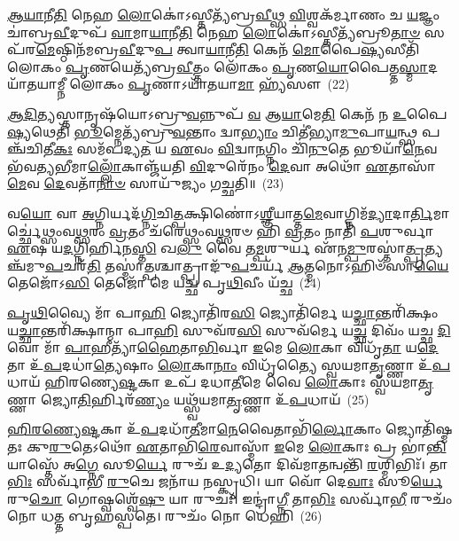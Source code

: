 \-\ul{𑌆}\-\-\ul{𑌯𑌾}\-𑌨𑍀\-\ul{𑌤𑌿} 𑌨𑍇𑌹 \ul{𑌲𑍋}\-𑌕𑍋॑\-𑌽𑌸𑍍𑌤𑍀𑌤𑍍𑌯᳴𑌬𑍍𑌰\-\ul{𑌵𑍀}\-𑌥𑍍𑌸 \ul{𑌵𑌿}\-𑌶𑍍𑌵𑌕᳴𑌰𑍍𑌮𑌾𑌣𑌂 𑌚 \ul{𑌯}\-𑌜𑍍𑌞𑌂 𑌚𑌾॑𑌬𑍍𑌰\-\ul{𑌵𑍀}\-𑌦𑍁𑌪᳴ \ul{𑌵𑌾}\-𑌮𑌾\-\ul{𑌯𑌾}\-𑌨𑍀\-\ul{𑌤𑌿} 𑌨𑍇𑌹 \ul{𑌲𑍋}\-𑌕𑍋॑\-𑌽𑌸𑍍𑌤𑍀𑌤𑍍𑌯᳴𑌬𑍍𑌰𑍂\-\ul{𑌤𑌾}\-\-\ul{𑍞} 𑌸 𑌪᳴𑌰\-\ul{𑌮𑍇}\-𑌷𑍍𑌠𑌿𑌨᳴𑌮𑌬𑍍𑌰\-\ul{𑌵𑍀}\-𑌦𑍁\-\ul{𑌪} 𑌤𑍍𑌵𑌾\-\ul{𑌯𑌾}\-𑌨𑍀\-\ul{𑌤𑌿} 𑌕𑍇𑌨᳴ \ul{𑌮𑍋}\-𑌪𑍈\-\ul{𑌷𑍍𑌯}\-𑌸𑍀𑌤𑌿᳴ 𑌲𑍋𑌕𑌂 \ul{𑌪𑍃}\-𑌣𑌯𑍇𑌤𑍍𑌯᳴𑌬𑍍𑌰\-\ul{𑌵𑍀}\-𑌤𑍍𑌤𑌂 𑌲𑍋᳴𑌕𑌂 \ul{𑌪𑍃}\-𑌣\-\ul{𑌯𑍋}\-𑌪𑍈𑌤𑍍𑌤\-\ul{𑌸𑍍𑌮𑌾}\-𑌦𑌯𑌾᳴𑌤𑌯𑌾𑌮𑍍𑌨𑍀 𑌲𑍋𑌕𑌂 \ul{𑌪𑍃}\-𑌣𑌾\-𑌽𑌯𑌾᳴𑌤𑌯𑌾\-\ul{𑌮𑌾} 𑌹𑍍𑌯᳴𑌸𑍗~(22)

\-\ul{𑌆}\-\-\ul{𑌦𑌿}\-𑌤𑍍𑌯𑌸𑍍𑌤𑌾𑌨𑍃𑌷᳴𑌯𑍋\-𑌽𑌬𑍍𑌰𑍁\-\ul{𑌵}\-𑌨𑍍𑌨𑍁𑌪᳴ \ul{𑌵} 𑌆\-\ul{𑌯𑌾}\-𑌮𑍇\-\ul{𑌤𑌿} 𑌕𑍇𑌨᳴ 𑌨 \ul{𑌉}\-𑌪𑍈\-\ul{𑌷𑍍𑌯}\-𑌥𑍇𑌤𑌿᳴ \ul{𑌭𑍂}\-𑌮𑍍𑌨𑍇𑌤𑍍𑌯᳴𑌬𑍍𑌰𑍁\-\ul{𑌵}\-𑌨𑍍𑌤𑌾𑌂 𑌦𑍍𑌵𑌾\-\ul{𑌭𑍍𑌯𑌾𑌂} 𑌚𑌿𑌤𑍀॑𑌭𑍍𑌯𑌾\-\ul{𑌮𑍁}\-𑌪𑌾\-\ul{𑌯}\-𑌨𑍍𑌥𑍍𑌸 𑌪𑌞𑍍𑌚᳴𑌚𑌿𑌤𑍀\-\ul{𑌕𑌃} 𑌸𑌮᳴𑌪𑌦𑍍𑌯\-\ul{𑌤} 𑌯 \ul{𑌏}\-𑌵𑌂 \ul{𑌵𑌿}\-𑌦𑍍𑌵𑌾\-\ul{𑌨}\-𑌗𑍍𑌨𑌿𑌂 𑌚𑌿᳴\-\ul{𑌨𑍁}\-𑌤𑍇 𑌭𑍂𑌯𑌾᳴\-\ul{𑌨𑍇}\-𑌵 𑌭᳴𑌵\-\ul{𑌤𑍍𑌯}\-𑌭𑍀𑌮𑌾\-\ul{𑌲𑍍𑌲𑍋𑌁}\-𑌕𑌾𑌞𑍍𑌜᳴𑌯𑌤𑌿 \ul{𑌵𑌿}\-𑌦𑍁𑌰𑍇᳴𑌨𑌂 \ul{𑌦𑍇}\-𑌵𑌾 𑌅𑌥𑍋᳴ \ul{𑌏}\-𑌤𑌾𑌸𑌾᳴\-\ul{𑌮𑍇}\-𑌵 \ul{𑌦𑍇}\-𑌵𑌤𑌾᳴\-\ul{𑌨𑌾}\-\-\ul{𑍞} 𑌸𑌾𑌯𑍁᳴𑌜𑍍𑌯𑌂 𑌗𑌚𑍍𑌛𑌤𑌿॥~(23)

{\anuvakamend[{𑌤𑌮᳴𑌸𑌾\-𑌽\-𑌽\-\ul{𑌦𑌿}\-𑌤𑍍𑌯𑍋॑\-𑌽𑌸𑍍𑌤𑍀\-\ul{𑌤𑌿} 𑌦𑌿𑌶᳴ 𑌆\-\ul{𑌦𑌿}\-𑌤𑍍𑌯𑌃 \ul{𑌪𑍍𑌰}\-𑌜𑌾𑌪᳴𑌤𑌿𑌮𑌬𑍍𑌰\-\ul{𑌵𑍀}\-𑌦𑍁𑌪᳴ \ul{𑌤𑍍𑌵𑌾}\-\-𑌽𑌸𑍗 𑌪𑌞𑍍𑌚᳴𑌚𑌤𑍍𑌵𑌾𑌰𑌿𑍞𑌶𑌚𑍍𑌚}]}%

𑌵\-\ul{𑌯𑍋} 𑌵𑌾 \ul{𑌅}\-𑌗𑍍𑌨𑌿𑌰𑍍𑌯𑌦᳴\-\ul{𑌗𑍍𑌨𑌿}\-𑌚𑌿\-\ul{𑌤𑍍𑌪}\-𑌕𑍍𑌷𑌿𑌣𑍋॑\-𑌽\-\ul{𑌶𑍍𑌞𑍀}\-𑌯𑌾𑌤𑍍𑌤\-\ul{𑌮𑍇}\-𑌵𑌾𑌗𑍍𑌨𑌿𑌮᳴\-\ul{𑌦𑍍𑌯𑌾}\-𑌦𑌾\-\ul{𑌰𑍍𑌤𑌿}\-𑌮𑌾𑌰𑍍𑌚𑍍𑌛𑍇॑𑌥𑍍𑌸𑌂𑌵\-\ul{𑌥𑍍𑌸}\-𑌰𑌂 \ul{𑌵𑍍𑌰}\-𑌤𑌂 𑌚᳴𑌰𑍇𑌥𑍍𑌸𑌂𑌵\-\ul{𑌥𑍍𑌸}\-𑌰𑍞 𑌹𑌿 \ul{𑌵𑍍𑌰}\-𑌤𑌂 𑌨𑌾𑌤𑌿᳴ \ul{𑌪}\-𑌶𑍁𑌰𑍍𑌵𑌾 \ul{𑌏}\-𑌷 𑌯\-\ul{𑌦}\-𑌗𑍍𑌨𑌿𑌰𑍍\mbox{}\-\ul{𑌹𑌿}\-𑌨\-\ul{𑌸𑍍𑌤𑌿} 𑌖\-\ul{𑌲𑍁} 𑌵𑍈 𑌤\-\ul{𑌮𑍍𑌪}\-𑌶𑍁𑌰𑍍𑌯 𑌏᳴𑌨\-\ul{𑌮𑍍𑌪𑍁}\-𑌰𑌸𑍍𑌤𑌾॑\-\ul{𑌤𑍍𑌪𑍍𑌰}\-𑌤𑍍𑌯𑌞𑍍𑌚᳴𑌮𑍁\-\ul{𑌪}\-𑌚𑌰᳴\-\ul{𑌤𑌿} 𑌤𑌸𑍍𑌮𑌾॑\-\ul{𑌤𑍍𑌪}\-𑌶𑍍𑌚𑌾𑌤𑍍𑌪𑍍𑌰𑌾𑌙𑍁᳴\-\ul{𑌪}\-𑌚𑌰𑍍𑌯᳴ \ul{𑌆}\-𑌤𑍍𑌮𑌨𑍋\-𑌽𑌹𑌿𑍞᳴𑌸𑌾\-\ul{𑌯𑍈} 𑌤𑍇𑌜𑍋᳴\-𑌽\-\ul{𑌸𑌿} 𑌤𑍇𑌜𑍋᳴ 𑌮𑍇 𑌯𑌚𑍍𑌛 𑌪𑍃\-\ul{𑌥𑌿}\-𑌵𑍀𑌂 𑌯᳴𑌚𑍍𑌛~(24)

\-\ul{𑌪𑍃}\-\-\ul{𑌥𑌿}\-𑌵𑍍𑌯𑍈 𑌮𑌾᳴ 𑌪𑌾\-\ul{𑌹𑌿} 𑌜𑍍𑌯𑍋𑌤𑌿᳴𑌰\-\ul{𑌸𑌿} 𑌜𑍍𑌯𑍋𑌤𑌿᳴𑌰𑍍𑌮𑍇 𑌯\-\ul{𑌚𑍍𑌛𑌾}\-𑌨𑍍𑌤𑌰𑌿᳴𑌕𑍍𑌷𑌂 𑌯\-\ul{𑌚𑍍𑌛𑌾}\-𑌨𑍍𑌤𑌰𑌿᳴𑌕𑍍𑌷𑌾𑌨𑍍𑌮𑌾 𑌪𑌾\-\ul{𑌹𑌿} 𑌸𑍁𑌵᳴𑌰\-\ul{𑌸𑌿} 𑌸𑍁𑌵᳴𑌰𑍍𑌮𑍇 𑌯\-\ul{𑌚𑍍𑌛} 𑌦𑌿𑌵𑌂᳴ 𑌯𑌚𑍍𑌛 \ul{𑌦𑌿}\-𑌵𑍋 𑌮𑌾᳴ \ul{𑌪𑌾}\-𑌹𑍀𑌤𑍍𑌯𑌾᳴\-\ul{𑌹𑍈}\-𑌤𑌾\-\ul{𑌭𑌿}\-𑌰𑍍𑌵𑌾 \ul{𑌇}\-𑌮𑍇 \ul{𑌲𑍋}\-𑌕𑌾 𑌵𑌿𑌧𑍃᳴\-\ul{𑌤𑌾} 𑌯\-\ul{𑌦𑍇}\-𑌤𑌾 𑌉᳴\-\ul{𑌪}\-𑌦𑌧𑌾॑\-\ul{𑌤𑍍𑌯𑍇}\-𑌷𑌾𑌂 \ul{𑌲𑍋}\-𑌕𑌾\-\ul{𑌨𑌾𑌂} 𑌵𑌿𑌧𑍃᳴𑌤𑍍𑌯𑍈 𑌸𑍍𑌵𑌯𑌮𑌾\-\ul{𑌤𑍃}\-𑌣𑍍𑌣𑌾 𑌉᳴\-\ul{𑌪}\-𑌧𑌾𑌯᳴ 𑌹𑌿𑌰𑌣𑍍𑌯𑍇\-\ul{𑌷𑍍𑌟}\-𑌕𑌾 𑌉𑌪᳴ 𑌦𑌧𑌾\-\ul{𑌤𑍀}\-𑌮𑍇 𑌵𑍈 \ul{𑌲𑍋}\-𑌕𑌾𑌃 𑌸𑍍𑌵᳴𑌯𑌮𑌾\-\ul{𑌤𑍃}\-𑌣𑍍𑌣𑌾 𑌜𑍍𑌯𑍋\-\ul{𑌤𑌿}\-𑌰𑍍\mbox{}𑌹𑌿𑌰᳴\-\ul{𑌣𑍍𑌯𑌂} 𑌯𑌥𑍍𑌸𑍍𑌵᳴𑌯𑌮𑌾\-\ul{𑌤𑍃}\-𑌣𑍍𑌣𑌾 𑌉᳴\-\ul{𑌪}\-𑌧𑌾𑌯᳴~(25)

\-\ul{𑌹𑌿}\-\-\ul{𑌰}\-\-\ul{𑌣𑍍𑌯𑍇}\-\-\ul{𑌷𑍍𑌟}\-𑌕𑌾 𑌉᳴\-\ul{𑌪}\-𑌦𑌧𑌾᳴\-\ul{𑌤𑍀}\-𑌮𑌾\-\ul{𑌨𑍇}\-𑌵𑍈𑌤𑌾𑌭𑌿᳴\-\ul{𑌰𑍍𑌲𑍋}\-𑌕𑌾𑌂 𑌜𑍍𑌯𑍋𑌤𑌿᳴𑌷𑍍𑌮𑌤𑌃 𑌕𑍁\-\ul{𑌰𑍁}\-𑌤𑍇\-𑌽𑌥𑍋᳴ \ul{𑌏}\-𑌤𑌾𑌭𑌿᳴\-\ul{𑌰𑍇}\-𑌵𑌾𑌸𑍍𑌮𑌾᳴ \ul{𑌇}\-𑌮𑍇 \ul{𑌲𑍋}\-𑌕𑌾𑌃 𑌪𑍍𑌰 𑌭𑌾॑\-\ul{𑌨𑍍𑌤𑌿} 𑌯𑌾𑌸𑍍𑌤𑍇᳴ 𑌅\-\ul{𑌗𑍍𑌨𑍇} 𑌸𑍂\-\ul{𑌰𑍍𑌯𑍇} 𑌰𑍁𑌚᳴ 𑌉\-\ul{𑌦𑍍𑌯}\-𑌤𑍋 𑌦𑌿𑌵᳴𑌮𑌾\-\ul{𑌤}\-𑌨𑍍𑌵𑌨𑍍𑌤𑌿᳴ \ul{𑌰}\-𑌶𑍍𑌮𑌿𑌭𑌿𑌃᳴। 𑌤𑌾\-\ul{𑌭𑌿𑌃} 𑌸𑌰𑍍𑌵𑌾᳴𑌭𑍀 \ul{𑌰𑍁}\-𑌚𑍇 𑌜𑌨𑌾᳴𑌯 𑌨𑌸𑍍𑌕𑍃𑌧𑌿। 𑌯𑌾 𑌵𑍋᳴ 𑌦𑍇\-\ul{𑌵𑌾𑌃} 𑌸𑍂\-\ul{𑌰𑍍𑌯𑍇} 𑌰𑍁\-\ul{𑌚𑍋} 𑌗𑍋𑌷𑍍𑌵𑌶𑍍𑌵𑍇᳴\-\ul{𑌷𑍁} 𑌯𑌾 𑌰𑍁𑌚𑌃᳴। 𑌇𑌨𑍍𑌦𑍍𑌰𑌾॑\-\ul{𑌗𑍍𑌨𑍀} 𑌤𑌾\-\ul{𑌭𑌿𑌃} 𑌸𑌰𑍍𑌵𑌾᳴\-\ul{𑌭𑍀} 𑌰𑍁𑌚𑌂᳴ 𑌨𑍋 𑌧𑌤𑍍𑌤 𑌬𑍃𑌹𑌸𑍍𑌪𑌤𑍇। 𑌰𑍁𑌚𑌂᳴ 𑌨𑍋 𑌧𑍇𑌹𑌿~(26)


